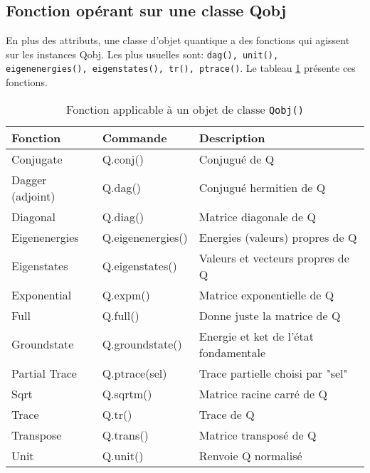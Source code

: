 \subsection{Fonction opérant sur une classe Qobj}

En plus des attributs, une classe d'objet quantique a des fonctions qui
agissent sur les instances Qobj. Les plus usuelles sont: \texttt{dag(), unit(), eigenenergies(), eigenstates(), tr(), ptrace()}.
Le tableau \ref{fonction} présente ces fonctions.
\begin{table}[!h]
\begin{center}
\begin{tabular}{|l|l|l|} \hline \hline
\textbf{Fonction}	& \textbf{Commande}	& \textbf{Description} \\ \hline \hline
Conjugate	& Q.conj()	& Conjugué de Q\\ \hline
Dagger (adjoint)	& Q.dag()	& Conjugué hermitien de Q\\ \hline
Diagonal	& Q.diag()	& Matrice diagonale de Q\\ \hline
Eigenenergies	& Q.eigenenergies()	&  Energies (valeurs) propres de Q\\ \hline
Eigenstates	& Q.eigenstates()	& Valeurs et vecteurs propres de Q\\ \hline
Exponential	& Q.expm()	& Matrice exponentielle de Q\\ \hline
Full	& Q.full()	& Donne juste la matrice de Q\\ \hline
Groundstate	& Q.groundstate()	& Energie et ket de l'état fondamentale\\ \hline
Partial Trace	& Q.ptrace(sel)	& Trace partielle choisi par "sel"\\ \hline
Sqrt	& Q.sqrtm()	& Matrice racine carré de Q\\ \hline
Trace	& Q.tr()	&  Trace de Q \\ \hline
Transpose	&  Q.trans()	& Matrice transposé de Q \\ \hline
Unit	& Q.unit()	& Renvoie Q normalisé \\ \hline
\end{tabular}
\caption{Fonction applicable à un objet de classe \texttt{Qobj()}}
\label{fonction}
\end{center}
\end{table}

